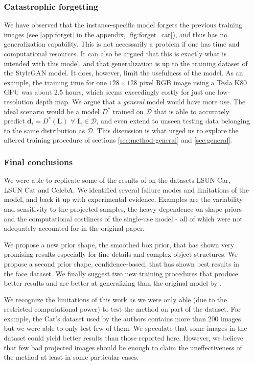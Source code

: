 \subsubsection{Catastrophic forgetting}
\label{sec:forget}
We have observed that the instance-specific model forgets the previous training images (see \autoref{app:forget} in the appendix, \autoref{fig:forget_cat}), and thus has no generalization capability. This is not necessarily a problem if one has time and computational resources. It can also be argued that this is exactly what is intended with this model, and that generalization is up to the training dataset of the StyleGAN model. It does, however, limit the usefulness of the model. As an example, the training time for one $128 \times 128$ pixel RGB image using a Tesla K80 GPU was about 2.5 hours, which seems exceedingly costly for just one low-resolution depth map. We argue that a \textit{general} model would have more use. The ideal scenario would be a model $D^*$ trained on $\mathcal{D}$ that is able to accurately predict $\textbf{d}_i = D^*(\textbf{I}_i)$ $\forall$ $ \textbf{I}_i \in \mathcal{D}$, and even extend to unseen testing data belonging to the same distribution as $\mathcal{D}$. This discussion is what urged us to explore the altered training procedure of sections \ref{sec:method-general} and \ref{sec:general}.

\subsubsection{Final conclusions}
We were able to replicate some of the results of \textcite{gan2shape} on the datasets LSUN Car, LSUN Cat and CelebA. We identified several failure modes and limitations of the model, and back it up with experimental evidence. Examples are the variability and sensitivity to the projected samples, the heavy dependence on shape priors and the computational costliness of the single-use model - all of which were not adequately accounted for in the original paper.

We propose a new prior shape, the smoothed box prior, that has shown very promising results especially for fine details and complex object structures. We propose a second prior shape, confidence-based, that has shown best results in the face dataset. We finally suggest two new training procedures that produce better results and are better at generalizing than the original model by \textcite{gan2shape}.

We recognize the limitations of this work as we were only able (due to the restricted computational power) to test the method on part of the dataset. For example, the Cat's dataset used by the authors contains more than 200 images but we were able to only test few of them. We speculate that some images in the dataset could yield better results than those reported here. However, we believe that few bad projected images should be enough to claim the uneffectiveness of the method at least in some particular cases.

